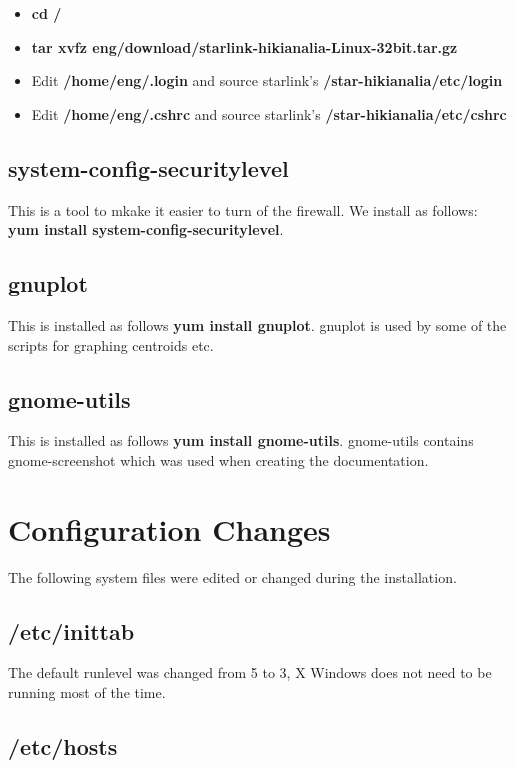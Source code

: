 \documentclass[10pt,a4paper]{article}
\begin{document}
\begin{itemize}
\item {\bf cd /}
\item {\bf tar xvfz \mytilde eng/download/starlink-hikianalia-Linux-32bit.tar.gz}
\item Edit {\bf /home/eng/.login} and source starlink's {\bf /star-hikianalia/etc/login}
\item Edit {\bf /home/eng/.cshrc} and source starlink's {\bf /star-hikianalia/etc/cshrc}
\end{itemize}

\subsection{system-config-securitylevel}

This is a tool to mkake it easier to turn of the firewall. We install as follows:
 {\bf yum install system-config-securitylevel}.

\subsection{gnuplot}

This is installed as follows {\bf yum install gnuplot}. gnuplot is used by some of the scripts
for graphing centroids etc.

\subsection{gnome-utils}

This is installed as follows {\bf yum install gnome-utils}. gnome-utils contains gnome-screenshot which was used when creating the documentation.

\section{Configuration Changes}

The following system files were edited or changed during the installation.

\subsection{/etc/inittab}

The default runlevel was changed from 5 to 3, X Windows does not need to be running most of the time.

\subsection{/etc/hosts}
\end{document}
